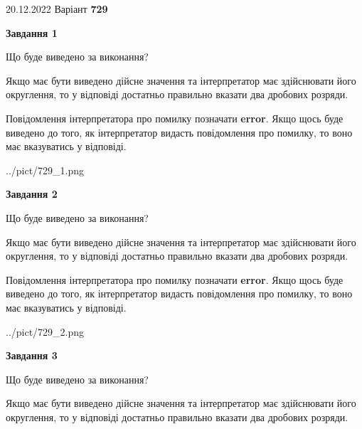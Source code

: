 \documentclass[12pt, ukrainian]{article}
\begin{document}
{20.12.2022 Варіант \No \textbf { 729 }\par}
{
\begin {Large}

{\begin {center}\textbf{Завдання 1}\end {center}}\par
Що буде виведено за виконання? \par

Якщо має бути виведено дійсне значення та інтерпретатор має здійснювати його округлення, 
то у відповіді достатньо правильно вказати два дробових розряди.

Повідомлення інтерпретатора про помилку позначати \textbf{error}.
Якщо щось буде виведено до того, як інтерпретатор видасть повідомлення про помилку, 
то воно має вказуватись у відповіді. \par

\begin{center}
	{../pict/729_1.png}
\end{center}
\newpage

{\begin {center}\textbf{Завдання 2}\end {center}}\par
Що буде виведено за виконання? \par

Якщо має бути виведено дійсне значення та інтерпретатор має здійснювати його округлення, 
то у відповіді достатньо правильно вказати два дробових розряди.

Повідомлення інтерпретатора про помилку позначати \textbf{error}.
Якщо щось буде виведено до того, як інтерпретатор видасть повідомлення про помилку, 
то воно має вказуватись у відповіді. \par

\begin{center}
	{../pict/729_2.png}
\end{center}
\newpage

{\begin {center}\textbf{Завдання 3}\end {center}}\par
Що буде виведено за виконання? \par

Якщо має бути виведено дійсне значення та інтерпретатор має здійснювати його округлення, 
то у відповіді достатньо правильно вказати два дробових розряди.


\end{Large}}
\end{document}
